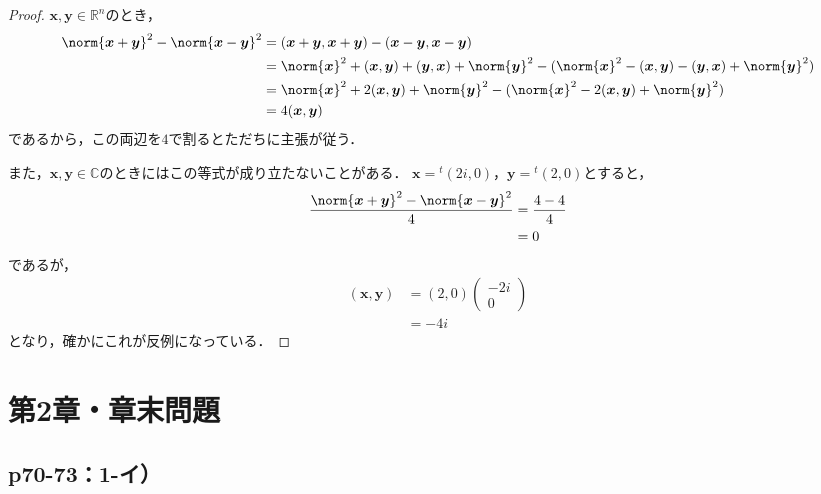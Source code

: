 \documentclass[uplatex,dvipdfmx,a4paper,10pt,fleqn]{jsarticle}
\begin{document}
\begin{tleftbar}
    \begin{proof}
        $\bm{x},\bm{y} \in \mathbb{R}^n$のとき，
        \begin{align*} 
            \norm{\bm{x}+\bm{y}}^2 - \norm{\bm{x}-\bm{y}}^2 & = (\bm{x}+\bm{y},\bm{x}+\bm{y}) - (\bm{x}-\bm{y},\bm{x}-\bm{y}) \\
            & = \norm{\bm{x}}^2 +(\bm{x},\bm{y})+(\bm{y},\bm{x})+ \norm{\bm{y}}^2 - (\norm{\bm{x}}^2 -(\bm{x},\bm{y})-(\bm{y},\bm{x})+\norm{\bm{y}}^2) \\
            & = \norm{\bm{x}}^2 + 2(\bm{x},\bm{y}) + \norm{\bm{y}}^2 - (\norm{\bm{x}}^2 - 2(\bm{x},\bm{y}) + \norm{\bm{y}}^2) \\
            & = 4(\bm{x},\bm{y})
        \end{align*}
        であるから，この両辺を$4$で割るとただちに主張が従う．
        
        また，$\bm{x},\bm{y} \in \mathbb{C}$のときにはこの等式が成り立たないことがある．
        $\bm{x}={}^t (2i,0)$，$\bm{y}={}^t (2,0)$とすると，
        \begin{align*}
        \frac{\norm{\bm{x}+\bm{y}}^2 - \norm{\bm{x}-\bm{y}}^2 }{4} &= \frac{4-4}{4} \\
        & =0
        \end{align*}
        であるが，
        \begin{align*}
        (\bm{x},\bm{y})& =(2,0) \begin{pmatrix} -2i  \\ 0 \end{pmatrix} \\
        &= -4i
        \end{align*}
        となり，確かにこれが反例になっている．
        \end{proof}
    \end{tleftbar}

\section*{第2章・章末問題}


\subsection*{p70-73：1-イ）}
\end{document}

